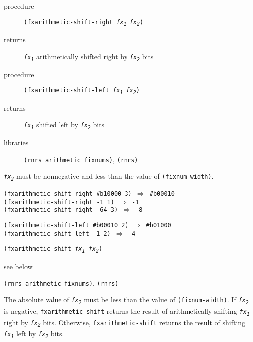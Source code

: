 \begin{description}

\label{objects_s172}\item[procedure] \texttt{(fxarithmetic-shift-right \textit{fx\textsubscript{1}} \textit{fx\textsubscript{2}})}



\item[returns] \texttt{\textit{fx\textsubscript{1}}} arithmetically shifted right by \texttt{\textit{fx\textsubscript{2}}} bits


\item[procedure] \texttt{(fxarithmetic-shift-left \textit{fx\textsubscript{1}} \textit{fx\textsubscript{2}})}



\item[returns] \texttt{\textit{fx\textsubscript{1}}} shifted left by \texttt{\textit{fx\textsubscript{2}}} bits


\item[libraries] \texttt{(rnrs arithmetic fixnums)}, \texttt{(rnrs)}
\end{description}

\texttt{\textit{fx\textsubscript{2}}} must be nonnegative and less than the value of
\texttt{(fixnum-width)}.

\begin{alltt}
(fxarithmetic-shift-right \#{}b10000 3) \(\Rightarrow\) \#{}b00010
(fxarithmetic-shift-right -1 1) \(\Rightarrow\) -1
(fxarithmetic-shift-right -64 3) \(\Rightarrow\) -8

(fxarithmetic-shift-left \#{}b00010 2) \(\Rightarrow\) \#{}b01000
(fxarithmetic-shift-left -1 2) \(\Rightarrow\) -4
\end{alltt}

\begin{description}

\label{objects_s173}\item[procedure] \texttt{(fxarithmetic-shift \textit{fx\textsubscript{1}} \textit{fx\textsubscript{2}})}



\item[returns] see below


\item[libraries] \texttt{(rnrs arithmetic fixnums)}, \texttt{(rnrs)}
\end{description}


The absolute value of \texttt{\textit{fx\textsubscript{2}}} must be less than the value of
\texttt{(fixnum-width)}.
If \texttt{\textit{fx\textsubscript{2}}} is negative, \texttt{fxarithmetic-shift} returns the
result of arithmetically shifting \texttt{\textit{fx\textsubscript{1}}} right by \texttt{\textit{fx\textsubscript{2}}} bits.
Otherwise, \texttt{fxarithmetic-shift} returns the
result of shifting \texttt{\textit{fx\textsubscript{1}}} left by \texttt{\textit{fx\textsubscript{2}}} bits.


